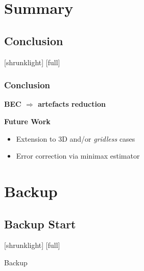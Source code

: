 \documentclass[14pt,compress,aspectratio=169]{beamer} %
\begin{document}
\section{Summary} 

\subsection{Conclusion}
[shrunklight]
[full]
\begin{frame}
\frametitle{Conclusion}
	\textbf{BEC $\Rightarrow$ artefacts reduction}
	\begin{table}
	\end{table}
	\vspace*{0.3cm}
	\textbf{Future Work}
	\begin{itemize}
		\item Extension to 3D and/or \textit{gridless} cases
		\item Error correction via minimax estimator
	\end{itemize}
\end{frame}


%

\appendix
\backupbegin
\section{Backup}
\subsection{Backup Start}
[shrunklight]
[full]
\begin{frame}
	\centering
	\huge Backup
\end{frame}

 

\backupend
\end{document}
